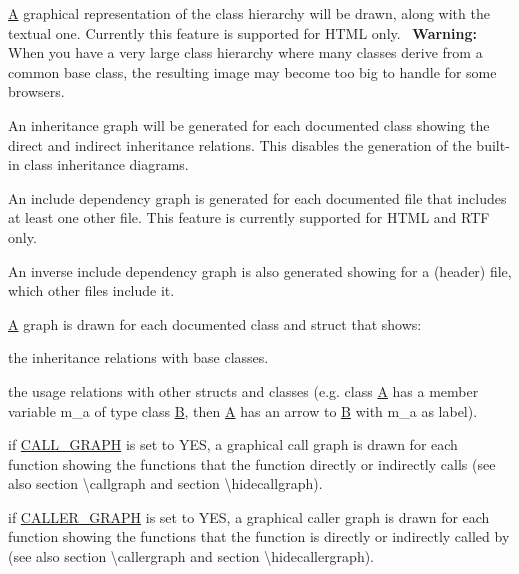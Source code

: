 \begin{DoxyItemize}
\item \mbox{\hyperlink{class_a}{A}} graphical representation of the class hierarchy will be drawn, along with the textual one. Currently this feature is supported for H\+T\+ML only.~\newline
 {\bfseries{Warning\+:}} When you have a very large class hierarchy where many classes derive from a common base class, the resulting image may become too big to handle for some browsers. 
\item An inheritance graph will be generated for each documented class showing the direct and indirect inheritance relations. This disables the generation of the built-\/in class inheritance diagrams. 
\item An include dependency graph is generated for each documented file that includes at least one other file. This feature is currently supported for H\+T\+ML and R\+TF only. 
\item An inverse include dependency graph is also generated showing for a (header) file, which other files include it. 
\item \mbox{\hyperlink{class_a}{A}} graph is drawn for each documented class and struct that shows\+: 
\begin{DoxyItemize}
\item the inheritance relations with base classes. 
\item the usage relations with other structs and classes (e.\+g. class {\ttfamily \mbox{\hyperlink{class_a}{A}}} has a member variable {\ttfamily m\+\_\+a} of type class {\ttfamily \mbox{\hyperlink{class_b}{B}}}, then {\ttfamily \mbox{\hyperlink{class_a}{A}}} has an arrow to {\ttfamily \mbox{\hyperlink{class_b}{B}}} with {\ttfamily m\+\_\+a} as label). 
\end{DoxyItemize}
\item if \mbox{\hyperlink{config_cfg_call_graph}{C\+A\+L\+L\+\_\+\+G\+R\+A\+PH}} is set to Y\+ES, a graphical call graph is drawn for each function showing the functions that the function directly or indirectly calls (see also section \textbackslash{}callgraph and section \textbackslash{}hidecallgraph). 
\item if \mbox{\hyperlink{config_cfg_caller_graph}{C\+A\+L\+L\+E\+R\+\_\+\+G\+R\+A\+PH}} is set to Y\+ES, a graphical caller graph is drawn for each function showing the functions that the function is directly or indirectly called by (see also section \textbackslash{}callergraph and section \textbackslash{}hidecallergraph). 
\end{DoxyItemize}

